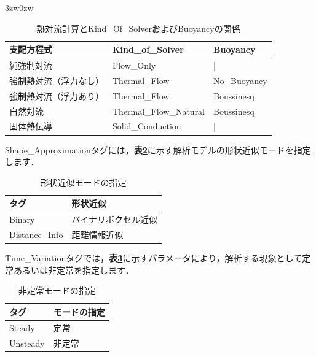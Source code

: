 \begin{indentation}{3zw}{0zw}
\begin{table}[htdp]
\caption{熱対流計算とKind\_Of\_SolverおよびBuoyancyの関係}
\begin{center}
\small
\begin{tabular}{lll} \toprule
支配方程式 & Kind\_of\_Solver & Buoyancy\\ \midrule
純強制対流 & Flow\_Only & |\\
強制熱対流（浮力なし）& Thermal\_Flow & No\_Buoyancy\\
強制熱対流（浮力あり）& Thermal\_Flow & Boussinesq\\
自然対流 & Thermal\_Flow\_Natural & Boussinesq\\
固体熱伝導 & Solid\_Conduction & |\\ \bottomrule
\end{tabular}
\end{center}
\label{tbl:kos}
\end{table}

\pagebreak
Shape\_Approximationタグには，\textbf{表\ref{tbl:ShapeApprox}}に示す解析モデルの形状近似モードを指定します．

\begin{table}[htdp]
\caption{形状近似モードの指定}
\begin{center}
\small
\begin{tabular}{ll} \toprule
タグ & 形状近似\\ \midrule
Binary & バイナリボクセル近似\\  \bottomrule
Distance\_Info & 距離情報近似\\
\end{tabular}
\end{center}
\label{tbl:ShapeApprox}
\end{table}

Time\_Variationタグでは，\textbf{表\ref{tbl:steady}}に示すパラメータにより，解析する現象として定常あるいは非定常を指定します．
\begin{table}[htdp]
\caption{非定常モードの指定}
\begin{center}
\small
\begin{tabular}{ll} \toprule
タグ & モードの指定\\ \midrule
Steady & 定常\\
Unsteady & 非定常\\ \bottomrule
\end{tabular}
\end{center}
\label{tbl:steady}
\end{table}

\end{indentation}



